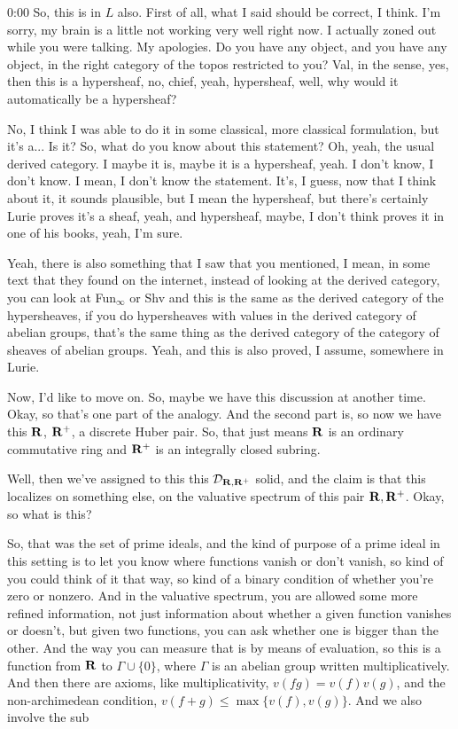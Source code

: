 \begin{unfinished}{0:00}
So, this is in $L$ also. First of all, what I said should be correct, I think. I'm sorry, my brain is a little not working very well right now. I actually zoned out while you were talking. My apologies. Do you have any object, and you have any object, in the right category of the topos restricted to you? Val, in the sense, yes, then this is a hypersheaf, no, chief, yeah, hypersheaf, well, why would it automatically be a hypersheaf?

No, I think I was able to do it in some classical, more classical formulation, but it's a... Is it? So, what do you know about this statement? Oh, yeah, the usual derived category. I maybe it is, maybe it is a hypersheaf, yeah. I don't know, I don't know. I mean, I don't know the statement. It's, I guess, now that I think about it, it sounds plausible, but I mean the hypersheaf, but there's certainly Lurie proves it's a sheaf, yeah, and hypersheaf, maybe, I don't think proves it in one of his books, yeah, I'm sure.

Yeah, there is also something that I saw that you mentioned, I mean, in some text that they found on the internet, instead of looking at the derived category, you can look at Fun$_\infty$ or Shv and this is the same as the derived category of the hypersheaves, if you do hypersheaves with values in the derived category of abelian groups, that's the same thing as the derived category of the category of sheaves of abelian groups. Yeah, and this is also proved, I assume, somewhere in Lurie.

Now, I'd like to move on. So, maybe we have this discussion at another time. Okay, so that's one part of the analogy. And the second part is, so now we have this $\mathbf R$, $\mathbf R^+$, a discrete Huber pair. So, that just means $\mathbf R$ is an ordinary commutative ring and $\mathbf R^+$ is an integrally closed subring.

Well, then we've assigned to this this $\mathcal{D}_{\mathbf R,\mathbf R^+}$ solid, and the claim is that this localizes on something else, on the valuative spectrum of this pair $\mathbf R, \mathbf R^+$. Okay, so what is this? 

So, that was the set of prime ideals, and the kind of purpose of a prime ideal in this setting is to let you know where functions vanish or don't vanish, so kind of you could think of it that way, so kind of a binary condition of whether you're zero or nonzero. And in the valuative spectrum, you are allowed some more refined information, not just information about whether a given function vanishes or doesn't, but given two functions, you can ask whether one is bigger than the other. And the way you can measure that is by means of evaluation, so this is a function from $\mathbf R$ to $\Gamma \cup \{0\}$, where $\Gamma$ is an abelian group written multiplicatively. And then there are axioms, like multiplicativity, $v(fg) = v(f)v(g)$, and the non-archimedean condition, $v(f+g) \le \max\{v(f), v(g)\}$. And we also involve the sub


\end{unfinished}
